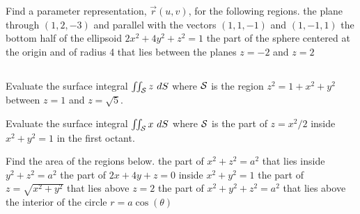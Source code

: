 \begin{Answer}

\end{Answer}

\begin{Exercise} Find a parameter representation, $\vec r(u,v)$, for the following regions. 
	\Question the plane through $(1,2,-3)$ and parallel with the vectors $(1,1,-1)$ and $(1,-1,1)$
	\Question the bottom half of the ellipsoid $2x^2+4y^2+z^2=1$
	\Question the part of the sphere centered at the origin and of radius 4 that lies between the planes $z=-2$ and $z=2$
\end{Exercise}

\begin{Answer}

\end{Answer}

\subsection*{}
\begin{Exercise} Evaluate the surface integral $ \iint_{\mathcal{S}} z \ dS $ where $\mathcal{S}$ is the region $z^2 = 1+x^2+y^2$ between $z=1$ and $z=\sqrt{5}$. %
\end{Exercise}

\begin{Answer}

\end{Answer}

\begin{Exercise} Evaluate the surface integral $ \iint_{\mathcal{S}} x \ dS $ where $\mathcal{S}$ is the part of $z=x^2/2$ inside $x^2+y^2=1$ in the first octant. %
\end{Exercise}

\begin{Answer}

\end{Answer}

\begin{Exercise} Find the area of the regions below.
	\Question the part of $x^2+z^2 = a^2$ that lies inside $y^2 + z^2 = a^2$ %
	\Question  the part of $2x+4y+z=0$ inside $x^2+y^2=1$
	\Question the part of $z=\sqrt{x^2+y^2}$ that lies above $z=2$
	\Question the part of $x^2+y^2+z^2=a^2$ that lies above the interior of the circle $r=a \cos (\theta)$
\end{Exercise}

